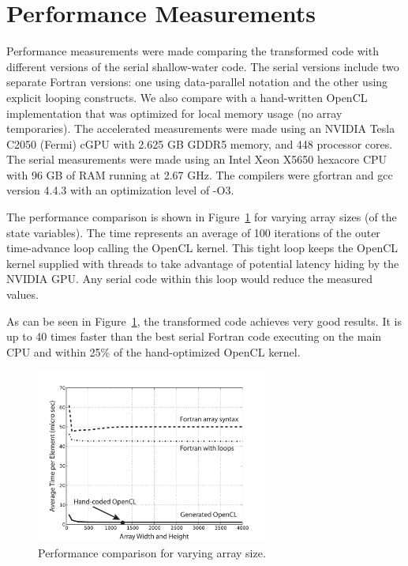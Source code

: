 \section{Performance Measurements}

Performance measurements were made comparing the transformed code with
different versions of the serial shallow-water code.  The serial
versions include two separate Fortran versions: one using
data-parallel notation and the other using explicit looping
constructs.  We also compare with a hand-written OpenCL implementation
that was optimized for local memory usage (no array temporaries).  The
accelerated measurements were made using an NVIDIA Tesla C2050 (Fermi)
cGPU with 2.625 GB GDDR5 memory, and 448 processor cores.  The serial
measurements were made using an Intel Xeon X5650 hexacore CPU with 96
GB of RAM running at 2.67 GHz.  The compilers were gfortran and gcc
version 4.4.3 with an optimization level of -O3.



The performance comparison is shown in Figure~\ref{fig:cl-performance} for
varying array sizes (of the state variables).  The time represents an average
of 100 iterations of the outer time-advance loop calling the OpenCL kernel.
This tight loop keeps the OpenCL kernel supplied with threads to take
advantage of potential latency hiding by the NVIDIA GPU.  Any serial code
within this loop would reduce the measured values.

As can be seen in Figure~\ref{fig:cl-performance}, the transformed
code achieves very good results.  It is up to 40 times faster than the
best serial Fortran code executing on the main CPU and within 25\% of
the hand-optimized OpenCL kernel.


\begin{figure}[!t]
\centering
\includegraphics[width=3in]{cl-performance.pdf}
\caption{Performance comparison for varying array size.}
\label{fig:cl-performance}
\end{figure}
